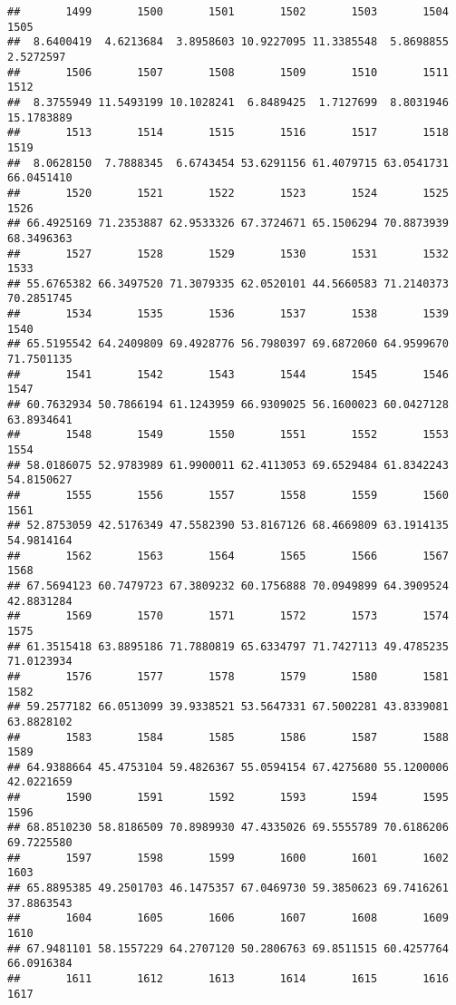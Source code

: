 \documentclass[
]{article}
\begin{document}
\begin{verbatim}
##       1499       1500       1501       1502       1503       1504       1505 
##  8.6400419  4.6213684  3.8958603 10.9227095 11.3385548  5.8698855  2.5272597 
##       1506       1507       1508       1509       1510       1511       1512 
##  8.3755949 11.5493199 10.1028241  6.8489425  1.7127699  8.8031946 15.1783889 
##       1513       1514       1515       1516       1517       1518       1519 
##  8.0628150  7.7888345  6.6743454 53.6291156 61.4079715 63.0541731 66.0451410 
##       1520       1521       1522       1523       1524       1525       1526 
## 66.4925169 71.2353887 62.9533326 67.3724671 65.1506294 70.8873939 68.3496363 
##       1527       1528       1529       1530       1531       1532       1533 
## 55.6765382 66.3497520 71.3079335 62.0520101 44.5660583 71.2140373 70.2851745 
##       1534       1535       1536       1537       1538       1539       1540 
## 65.5195542 64.2409809 69.4928776 56.7980397 69.6872060 64.9599670 71.7501135 
##       1541       1542       1543       1544       1545       1546       1547 
## 60.7632934 50.7866194 61.1243959 66.9309025 56.1600023 60.0427128 63.8934641 
##       1548       1549       1550       1551       1552       1553       1554 
## 58.0186075 52.9783989 61.9900011 62.4113053 69.6529484 61.8342243 54.8150627 
##       1555       1556       1557       1558       1559       1560       1561 
## 52.8753059 42.5176349 47.5582390 53.8167126 68.4669809 63.1914135 54.9814164 
##       1562       1563       1564       1565       1566       1567       1568 
## 67.5694123 60.7479723 67.3809232 60.1756888 70.0949899 64.3909524 42.8831284 
##       1569       1570       1571       1572       1573       1574       1575 
## 61.3515418 63.8895186 71.7880819 65.6334797 71.7427113 49.4785235 71.0123934 
##       1576       1577       1578       1579       1580       1581       1582 
## 59.2577182 66.0513099 39.9338521 53.5647331 67.5002281 43.8339081 63.8828102 
##       1583       1584       1585       1586       1587       1588       1589 
## 64.9388664 45.4753104 59.4826367 55.0594154 67.4275680 55.1200006 42.0221659 
##       1590       1591       1592       1593       1594       1595       1596 
## 68.8510230 58.8186509 70.8989930 47.4335026 69.5555789 70.6186206 69.7225580 
##       1597       1598       1599       1600       1601       1602       1603 
## 65.8895385 49.2501703 46.1475357 67.0469730 59.3850623 69.7416261 37.8863543 
##       1604       1605       1606       1607       1608       1609       1610 
## 67.9481101 58.1557229 64.2707120 50.2806763 69.8511515 60.4257764 66.0916384 
##       1611       1612       1613       1614       1615       1616       1617 

\end{verbatim}
\end{document}
